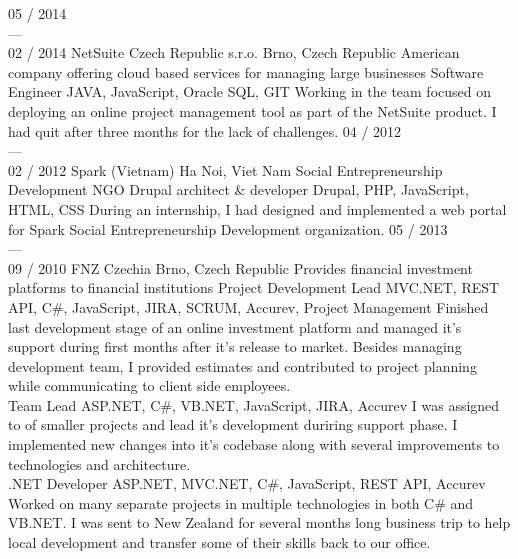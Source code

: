 \documentclass[]{friggeri-cv} %
\begin{document}
    \begin{entrylist}
        \job
        {05 / 2014 \\ --- \\ 02 / 2014}
        {NetSuite Czech Republic s.r.o.}
        {Brno, Czech Republic}
        {American company offering cloud based services for managing large businesses}
        {
            \position
            {Software Engineer}
            {JAVA, JavaScript, Oracle SQL, GIT}
            {Working in the team focused on deploying an online project management tool as part of the NetSuite product.
            I had quit after three months for the lack of challenges.}
        }
        \job
        {04 / 2012 \\ --- \\ 02 / 2012}
        {Spark (Vietnam)}
        {Ha Noi, Viet Nam}
        {Social Entrepreneurship Development NGO}
        {
            \position
            {Drupal architect \& developer}
            {Drupal, PHP, JavaScript, HTML, CSS}
            {During an internship, I had designed and implemented a web portal for Spark Social Entrepreneurship Development organization.}
        }
        \job
        {05 / 2013 \\ --- \\ 09 / 2010}
        {FNZ Czechia}
        {Brno, Czech Republic}
        {Provides financial investment platforms to financial institutions}
        {
            \position
            {Project Development Lead}
            {MVC.NET, REST API, C\#, JavaScript, JIRA, SCRUM, Accurev, Project Management}
            {Finished last development stage of an online investment platform and managed it's support during first months after it's
            release to market. Besides managing development team, I provided estimates and contributed to project planning
            while communicating to client side employees.}\\
            \position
            {Team Lead}
            {ASP.NET, C\#, VB.NET, JavaScript, JIRA, Accurev}
            {I was assigned to of smaller projects and lead it's development duriring support phase. I implemented new changes
            into it's codebase along with several improvements to technologies and architecture.}\\
            \position
            {.NET Developer}
            {ASP.NET, MVC.NET, C\#, JavaScript, REST API, Accurev}
            {Worked on many separate projects in multiple technologies in both C\# and VB.NET. I was sent to New Zealand for
            several months long business trip to help local development and transfer some of their skills back to our office.}%
        }
    \end{entrylist}
\end{document}
